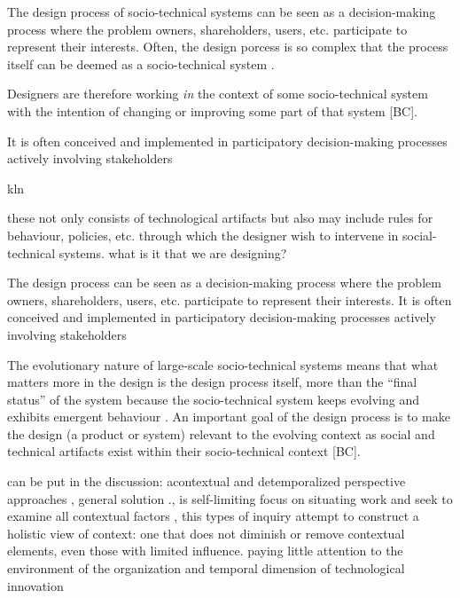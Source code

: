 \begin{svgraybox}

 The design process of socio-technical systems can be seen as a decision-making process where the problem owners, shareholders, users, etc. participate to represent their interests. Often, the design porcess is so complex that the process itself can be deemed as a socio-technical system \cite{Baxter2011}. 



Designers are therefore working \textit{in} the context of some socio-technical system with the intention of changing or improving some part of that system [BC]. 

It is often conceived and implemented in participatory decision-making processes actively involving stakeholders

kln





 these not only consists of technological artifacts but also may include rules for behaviour, policies, etc. through which the designer wish to intervene in social-technical systems. what is it that we are designing? 

 The design process can be seen as a decision-making process where the problem owners, shareholders, users, etc. participate to represent their interests. It is often conceived and implemented in participatory decision-making processes actively involving stakeholders



The evolutionary nature of large-scale socio-technical systems means that what matters more in the design is the design process itself, more than the ``final status'' of the system \cite{Shin2014, need more ref} because the socio-technical system keeps evolving and exhibits emergent behaviour \cite{Nikolic2009}. An important  goal of the design process is to make the design (a product or system) relevant to the evolving context \cite{Shin2014, need more ref} as social and technical artifacts exist within their socio-technical context [BC]. 

\end{svgraybox}



\begin{svgraybox}
can be put in the discussion: 
acontextual and detemporalized perspective approaches , general solution ., is self-limiting 
focus on situating work and seek to examine all contextual factors , this types of inquiry attempt to construct a holistic view of context: one that does not diminish or remove contextual elements, even those with limited influence. 
paying little attention to the environment of the organization and temporal dimension of technological innovation  \cite{Sawyer2014}
\end{svgraybox}


